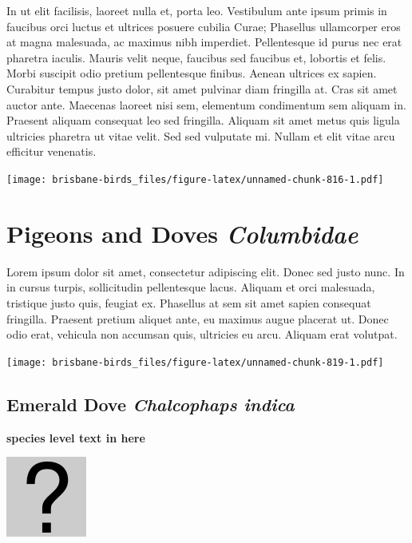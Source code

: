 \documentclass[]{book}
\let\origfigure\figure
\let\endorigfigure\endfigure
\renewenvironment{figure}[1][2] {
  \expandafter\origfigure\expandafter[H]
} {
  \endorigfigure
}
\begin{document}
In ut elit facilisis, laoreet nulla et, porta leo. Vestibulum ante ipsum
primis in faucibus orci luctus et ultrices posuere cubilia Curae;
Phasellus ullamcorper eros at magna malesuada, ac maximus nibh
imperdiet. Pellentesque id purus nec erat pharetra iaculis. Mauris velit
neque, faucibus sed faucibus et, lobortis et felis. Morbi suscipit odio
pretium pellentesque finibus. Aenean ultrices ex sapien. Curabitur
tempus justo dolor, sit amet pulvinar diam fringilla at. Cras sit amet
auctor ante. Maecenas laoreet nisi sem, elementum condimentum sem
aliquam in. Praesent aliquam consequat leo sed fringilla. Aliquam sit
amet metus quis ligula ultricies pharetra ut vitae velit. Sed sed
vulputate mi. Nullam et elit vitae arcu efficitur venenatis.

\begin{figure}
\centering
\texttt{[image: brisbane-birds\_files/figure-latex/unnamed-chunk-816-1.pdf]}
\caption{\label{fig:unnamed-chunk-816}insert figure caption}
\end{figure}

\chapter{\texorpdfstring{Pigeons and Doves
\emph{Columbidae}}{Pigeons and Doves Columbidae}}\label{pigeons-and-doves-columbidae}

Lorem ipsum dolor sit amet, consectetur adipiscing elit. Donec sed justo
nunc. In in cursus turpis, sollicitudin pellentesque lacus. Aliquam et
orci malesuada, tristique justo quis, feugiat ex. Phasellus at sem sit
amet sapien consequat fringilla. Praesent pretium aliquet ante, eu
maximus augue placerat ut. Donec odio erat, vehicula non accumsan quis,
ultricies eu arcu. Aliquam erat volutpat.

\texttt{[image: brisbane-birds\_files/figure-latex/unnamed-chunk-819-1.pdf]}

\section{\texorpdfstring{Emerald Dove \emph{Chalcophaps
indica}}{Emerald Dove Chalcophaps indica}}\label{emerald-dove-chalcophaps-indica}

\textbf{species level text in here}

\begin{figure}
\centering
\includegraphics{assets/missing.png}
\caption{No image for species}
\end{figure}
\end{document}
